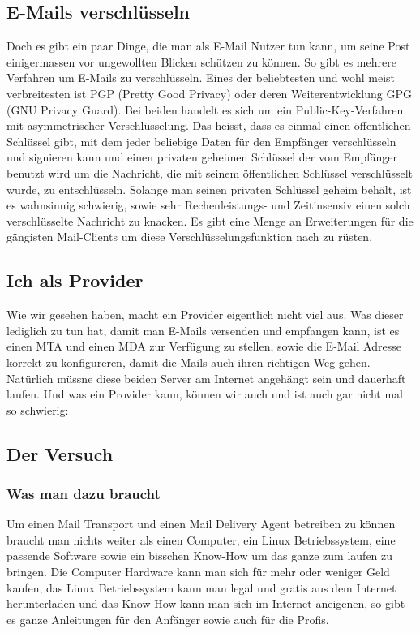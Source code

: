 \subsection{E-Mails verschlüsseln}
Doch es gibt ein paar Dinge, die man als E-Mail Nutzer tun kann, um seine Post einigermassen vor ungewollten Blicken schützen zu können.
So gibt es mehrere Verfahren um E-Mails zu verschlüsseln. Eines der beliebtesten und wohl meist verbreitesten ist PGP (Pretty Good Privacy) oder deren Weiterentwicklung GPG (GNU Privacy Guard).
Bei beiden handelt es sich um ein Public-Key-Verfahren mit asymmetrischer Verschlüsselung. Das heisst, dass es einmal einen öffentlichen Schlüssel gibt, mit dem jeder beliebige Daten für den Empfänger verschlüsseln und signieren kann und einen privaten geheimen Schlüssel der vom Empfänger benutzt wird um die Nachricht, die mit seinem öffentlichen Schlüssel verschlüsselt wurde, zu entschlüsseln.
Solange man seinen privaten Schlüssel geheim behält, ist es wahnsinnig schwierig, sowie sehr Rechenleistungs- und Zeitinsensiv einen solch verschlüsselte Nachricht zu knacken.
Es gibt eine Menge an Erweiterungen für die gängisten Mail-Clients um diese Verschlüsselungsfunktion nach zu rüsten.
\subsection{Ich als Provider}
Wie wir gesehen haben, macht ein Provider eigentlich nicht viel aus. Was dieser lediglich zu tun hat, damit man E-Mails versenden und empfangen kann, ist es einen MTA und einen MDA zur Verfügung zu stellen, sowie die E-Mail Adresse korrekt zu konfigureren, damit die Mails auch ihren richtigen Weg gehen. Natürlich müssne diese beiden Server am Internet angehängt sein und dauerhaft laufen.
Und was ein Provider kann, können wir auch und ist auch gar nicht mal so schwierig:
\subsection{Der Versuch}
\subsubsection{Was man dazu braucht}
Um einen Mail Transport und einen Mail Delivery Agent betreiben zu können braucht man nichts weiter als einen Computer, ein Linux Betriebssystem, eine passende Software sowie ein bisschen Know-How um das ganze zum laufen zu bringen. Die Computer Hardware kann man sich für mehr oder weniger Geld kaufen, das Linux Betriebssystem kann man legal und gratis aus dem Internet herunterladen und das Know-How kann man sich im Internet aneigenen, so gibt es ganze Anleitungen für den Anfänger sowie auch für die Profis.

